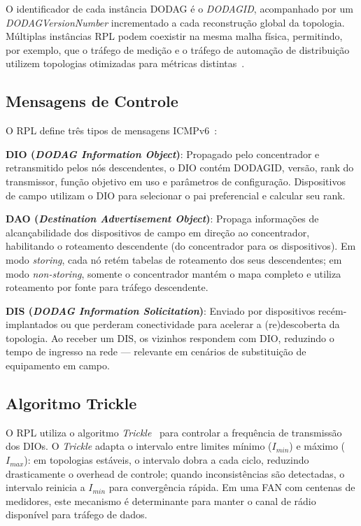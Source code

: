 \documentclass[conference]{IEEEtran}
\begin{document}
O identificador de cada instância DODAG é o \textit{DODAGID}, acompanhado por
um \textit{DODAGVersionNumber} incrementado a cada reconstrução global da
topologia. Múltiplas instâncias RPL podem coexistir na mesma malha física,
permitindo, por exemplo, que o tráfego de medição e o tráfego de automação de
distribuição utilizem topologias otimizadas para métricas
distintas~\cite{winter2012rpl}.

\subsection{Mensagens de Controle}

O RPL define três tipos de mensagens ICMPv6~\cite{winter2012rpl}:

\textbf{DIO (\textit{DODAG Information Object})}: Propagado pelo concentrador e
retransmitido pelos nós descendentes, o DIO contém DODAGID, versão, rank do
transmissor, função objetivo em uso e parâmetros de configuração. Dispositivos
de campo utilizam o DIO para selecionar o pai preferencial e calcular seu rank.

\textbf{DAO (\textit{Destination Advertisement Object})}: Propaga informações de
alcançabilidade dos dispositivos de campo em direção ao concentrador, habilitando
o roteamento descendente (do concentrador para os dispositivos). Em modo
\textit{storing}, cada nó retém tabelas de roteamento dos seus descendentes; em
modo \textit{non-storing}, somente o concentrador mantém o mapa completo e utiliza
roteamento por fonte para tráfego descendente.

\textbf{DIS (\textit{DODAG Information Solicitation})}: Enviado por dispositivos
recém-implantados ou que perderam conectividade para acelerar a (re)descoberta da
topologia. Ao receber um DIS, os vizinhos respondem com DIO, reduzindo o tempo de
ingresso na rede --- relevante em cenários de substituição de equipamento em campo.

\subsection{Algoritmo Trickle}

O RPL utiliza o algoritmo \textit{Trickle}~\cite{rfc6206} para controlar a frequência de
transmissão dos DIOs. O \textit{Trickle} adapta o intervalo entre limites mínimo
($I_{min}$) e máximo ($I_{max}$): em topologias estáveis, o intervalo dobra a
cada ciclo, reduzindo drasticamente o overhead de controle; quando inconsistências
são detectadas, o intervalo reinicia a $I_{min}$ para convergência rápida. Em uma
FAN com centenas de medidores, este mecanismo é determinante para manter o canal
de rádio disponível para tráfego de dados.
\end{document}
